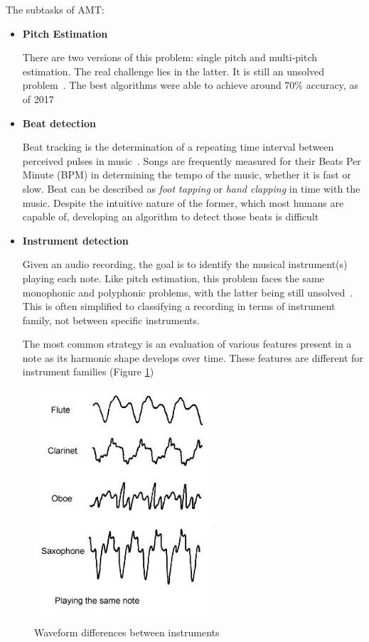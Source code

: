 \par
The subtasks of AMT:
\begin{itemize}
	\item \textbf{Pitch Estimation}
	\par
	There are two versions of this problem: single pitch and multi-pitch estimation. The real challenge lies in the latter. It is still an unsolved problem~\cite{glass_ceiling}.
	The best algorithms were able to achieve around 70\% accuracy, as of 2017~\cite{music_retrieval}
	\item \textbf{Beat detection}
	\par
	Beat tracking is the determination of a repeating time interval between perceived pulses in music~\cite{transcription}.
	Songs are frequently measured for their Beats Per Minute (BPM) in determining the tempo of the music, whether it is fast or slow.
	Beat can be described as \textit{foot tapping} or \textit{hand clapping} in time with the music. Despite the intuitive nature of the former, which most humans are capable of, developing an algorithm to detect those beats is difficult
	\item \textbf{Instrument detection}
	\par
	Given an audio recording, the goal is to identify the musical instrument(s) playing each note. Like pitch estimation, this problem faces the same monophonic and polyphonic problems, with the latter being still unsolved~\cite{instrument_identification}. This is often simplified to classifying a recording in terms of instrument family, not between specific instruments.
	\par
	The most common strategy is an evaluation of various features present in a note as its harmonic shape develops over time. These features are different for instrument families (Figure \ref{fig:instruments})
\end{itemize}

\begin{figure}[h]
	\caption[Waveform differences between instruments]{Waveform differences between instruments~\cite{waves_instruments}}
	\centering
	\label{fig:instruments}
	\includegraphics[width=0.6\textwidth, height=0.4\textheight, keepaspectratio]{"resources/instruments"}
\end{figure}

